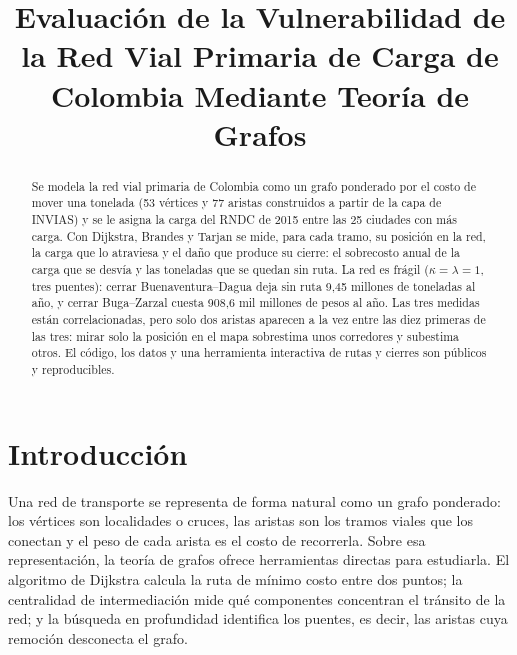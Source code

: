 \documentclass[conference]{IEEEtran}
\begin{document}
\title{Evaluación de la Vulnerabilidad de la Red Vial Primaria de Carga de Colombia Mediante Teoría de Grafos}

\author{
}

\maketitle

\begin{abstract}
Se modela la red vial primaria de Colombia como un grafo ponderado por el costo
de mover una tonelada (53 vértices y 77 aristas construidos a partir de la capa
de INVIAS) y se le asigna la carga del RNDC de 2015 entre las 25 ciudades con
más carga. Con Dijkstra, Brandes y Tarjan se mide, para cada tramo, su posición
en la red, la carga que lo atraviesa y el daño que produce su cierre: el
sobrecosto anual de la carga que se desvía y las toneladas que se quedan sin
ruta. La red es frágil ($\kappa=\lambda=1$, tres puentes): cerrar
Buenaventura--Dagua deja sin ruta 9,45 millones de toneladas al año, y cerrar
Buga--Zarzal cuesta 908,6 mil millones de pesos al año. Las tres medidas están
correlacionadas, pero solo dos aristas aparecen a la vez entre las diez primeras
de las tres: mirar solo la posición en el mapa sobrestima unos corredores y
subestima otros. El código, los datos y una herramienta interactiva de rutas
y cierres son públicos y reproducibles.
\end{abstract}


\section{Introducción}
Una red de transporte se representa de forma natural como un
grafo ponderado: los vértices son localidades o cruces, las aristas son los
tramos viales que los conectan y el peso de cada arista es el costo de
recorrerla. Sobre esa representación, la teoría de grafos ofrece herramientas
directas para estudiarla. El algoritmo de Dijkstra \cite{dijkstra1959} calcula
la ruta de mínimo costo entre dos puntos; la centralidad de intermediación
\cite{brandes2001} mide qué componentes concentran el tránsito de la red; y la
búsqueda en profundidad \cite{tarjan1972} identifica los puentes, es decir, las
aristas cuya remoción desconecta el grafo.
\end{document}
